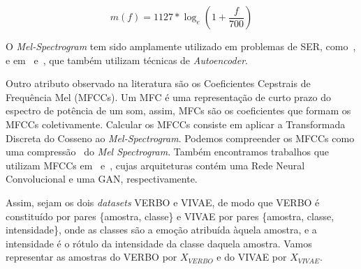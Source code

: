 \begin{equation}
    m(f) = 1127 * \log_e{(1 + \frac{f}{700})}
\end{equation}

O \textit{Mel-Spectrogram} tem sido amplamente utilizado em problemas de \acrshort{SER}, como~\cite{32.25, 32.30}, e em~\cite{32.31} e~\cite{32.32}, que também utilizam técnicas de \textit{Autoencoder}.

Outro atributo observado na literatura são os Coeficientes Cepstrais de Frequência Mel (\acrshort{MFCC}s). Um \acrshort{MFC} é uma representação de curto prazo do espectro de potência de um som, assim, \acrshort{MFC}s são os coeficientes que formam os \acrshort{MFCC}s coletivamente. Calcular os \acrshort{MFCC}s consiste em aplicar a Transformada Discreta do Cosseno ao \textit{Mel-Spectrogram}. Podemos compreender os \acrshort{MFCC}s como uma compressão~\cite{64} do \textit{Mel Spectrogram}. Também encontramos trabalhos que utilizam \acrshort{MFCC}s em~\cite{32.79} e~\cite{32.89}, cujas arquiteturas contém uma Rede Neural Convolucional e uma \acrshort{GAN}, respectivamente.





Assim, sejam os dois \textit{datasets} VERBO e VIVAE, de modo que VERBO é constituído por pares \{amostra, classe\} e VIVAE por pares \{amostra, classe, intensidade\}, onde as classes são a emoção atribuída àquela amostra, e a intensidade é o rótulo da intensidade da classe daquela amostra. Vamos representar as amostras do VERBO por $X_{VERBO}$ e do VIVAE por $X_{VIVAE}$.

